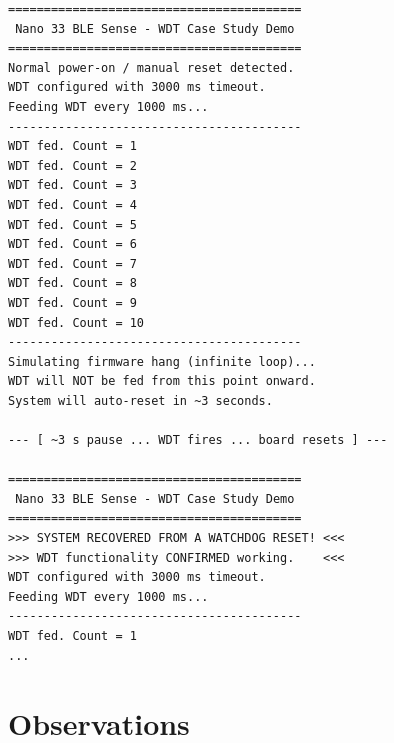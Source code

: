 \documentclass[12pt, a4paper]{article}
\begin{document}
\begin{lstlisting}[language={}, caption={Serial Monitor output showing the
  full hang-reset-recovery cycle.}, basicstyle=\ttfamily\footnotesize]
=========================================
 Nano 33 BLE Sense - WDT Case Study Demo
=========================================
Normal power-on / manual reset detected.
WDT configured with 3000 ms timeout.
Feeding WDT every 1000 ms...
-----------------------------------------
WDT fed. Count = 1
WDT fed. Count = 2
WDT fed. Count = 3
WDT fed. Count = 4
WDT fed. Count = 5
WDT fed. Count = 6
WDT fed. Count = 7
WDT fed. Count = 8
WDT fed. Count = 9
WDT fed. Count = 10
-----------------------------------------
Simulating firmware hang (infinite loop)...
WDT will NOT be fed from this point onward.
System will auto-reset in ~3 seconds.

--- [ ~3 s pause ... WDT fires ... board resets ] ---

=========================================
 Nano 33 BLE Sense - WDT Case Study Demo
=========================================
>>> SYSTEM RECOVERED FROM A WATCHDOG RESET! <<<
>>> WDT functionality CONFIRMED working.    <<<
WDT configured with 3000 ms timeout.
Feeding WDT every 1000 ms...
-----------------------------------------
WDT fed. Count = 1
...
\end{lstlisting}

\section{Observations}
\end{document}
